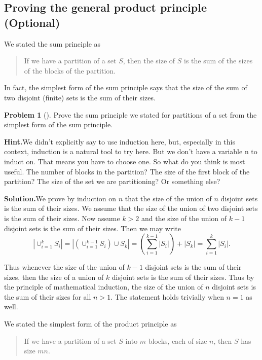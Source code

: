 \documentclass[10pt,]{book}
\theoremstyle{plain}
\theoremstyle{definition}
\newtheorem{activity}[project]{Problem}
\theoremstyle{definition}
\numberwithin{equation}{chapter}
\begin{document}
\subsection[{Proving the general product principle (Optional)}]{Proving the general product principle (Optional)}\label{subsection-8}
We stated the sum principle as%
\begin{quote}\hypertarget{blockquote-9}{}
If we have a partition of a set \(S\), then the size of \(S\) is the sum of the sizes of the blocks of the partition.%
\end{quote}
In fact, the simplest form of the sum principle says that the size of the sum of two disjoint (finite) sets is the sum of their sizes.%
\begin{activity}[]\label{activity-79}
Prove the sum principle we stated for partitions of a set from the simplest form of the sum principle.%
\par\medskip\noindent%
\textbf{Hint.}\quad We didn't explicitly say to use induction here, but, especially in this context, induction is a natural tool to try here. But we don't have a variable n to induct on. That means you have to choose one. So what do you think is most useful. The number of blocks in the partition? The size of the first block of the partition? The size of the set we are partitioning? Or something else?%
\par\medskip\noindent%
\textbf{Solution.}\quad We prove by induction on \(n\) that the size of the union of \(n\) disjoint sets is the sum of their sizes. We assume that the size of the union of two disjoint sets is the sum of their sizes. Now assume \(k>2\) and the size of the union of \(k-1\) disjoint sets is the sum of their sizes. Then we may write%
\begin{equation*}
|\cup_{i=1}^k S_i|=|\left(\cup_{i=1}^{k-1}S_i\right)\cup
S_k|=\left(\sum_{i=1}^{k-1}|S_i|\right) +|S_k|=\sum_{i=1}^k|S_i|.
\end{equation*}
%
\par
Thus whenever the size of the union of \(k-1\) disjoint sets is the sum of their sizes, then the size of a union of \(k\) disjoint sets is the sum of their sizes. Thus by the principle of mathematical induction, the size of the union of \(n\) disjoint sets is the sum of their sizes for all \(n>1\). The statement holds trivially when \(n=1\) as well.%
\end{activity}
We stated the simplest form of the product principle as%
\begin{quote}\hypertarget{blockquote-10}{}
If we have a partition of a set \(S\) into \(m\) blocks, each of size \(n\), then \(S\) has size \(mn\).%
\end{quote}
\end{document}
